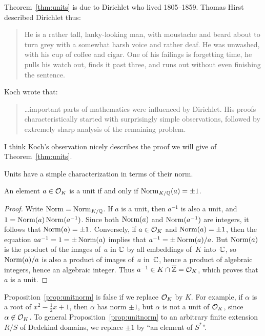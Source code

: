 \begin{remark}
	Theorem~\ref{thm:units} is due to Dirichlet  who lived 1805--1859.
	Thomas Hirst described Dirichlet thus:
	\begin{quote}
		He is a rather tall, lanky-looking man, with moustache and beard about
		to turn grey with a somewhat harsh voice and rather deaf. He was
		unwashed, with his cup of coffee and cigar. One of his failings is
		forgetting time, he pulls his watch out, finds it past three, and runs
		out without even finishing the sentence.
	\end{quote}
	Koch wrote that:
	\begin{quote}
		\dots important parts of mathematics were influenced by Dirichlet. His
		proofs characteristically started with surprisingly simple observations,
		followed by extremely sharp analysis of the remaining problem.
	\end{quote}
	I think Koch's observation nicely describes the proof we will give of
	Theorem~\ref{thm:units}.
\end{remark}

Units have a simple characterization in terms of their norm.
\begin{proposition}\label{prop:unitnorm}
	An element $a\in \mathcal{O}_K$ is a unit if and only if $\operatorname{Norm}_{K/\mathbb{Q}}(a)=\pm 1$.
\end{proposition}
\begin{proof}
	Write $\operatorname{Norm}=\operatorname{Norm}_{K/\mathbb{Q}}$.  If $a$ is a unit, then $a^{-1}$ is also a
	unit, and $1=\operatorname{Norm}(a)\operatorname{Norm}(a^{-1})$.  Since both $\operatorname{Norm}(a)$ and
	$\operatorname{Norm}(a^{-1})$ are integers, it follows that $\operatorname{Norm}(a)=\pm 1$.
	Conversely, if $a\in \mathcal{O}_K$ and $\operatorname{Norm}(a)=\pm 1$, then the equation
	$aa^{-1}=1=\pm \operatorname{Norm}(a)$ implies that $a^{-1} = \pm \operatorname{Norm}(a)/a$.  But
	$\operatorname{Norm}(a)$ is the product of the images of~$a$ in $\mathbb{C}$ by all
	embeddings of~$K$ into~$\mathbb{C}$, so $\operatorname{Norm}(a)/a$ is also a product of
	images of~$a$ in~$\mathbb{C}$, hence a product of algebraic integers,
	hence an algebraic integer. Thus $a^{-1}\in K\cap \overline{\mathbb{Z}} = \mathcal{O}_K$,
	which proves that~$a$ is a unit.
\end{proof}

\begin{remark}
	Proposition~\ref{prop:unitnorm} is false if we replace $\mathcal{O}_K$ by $K$.
	For example, if $\alpha$ is a root of $x^2-\frac{1}{2}x+1$, then
	$\alpha$ has norm $\pm 1$, but $\alpha$ is not a unit of $\mathcal{O}_K$, since
	$\alpha\not\in \mathcal{O}_K$.  To general Proposition~\ref{prop:unitnorm} to an
	arbitrary finite extension $R/S$ of Dedekind domains, we replace $\pm
	1$ by ``an element of $S^*$''.
\end{remark}

